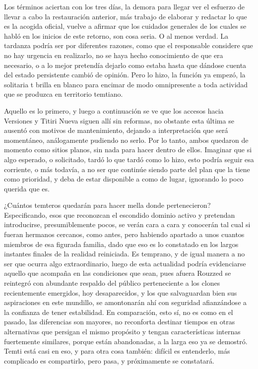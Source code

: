 \documentclass[
]{book}
\begin{document}
Los términos aciertan con los tres días, la demora para llegar ver el esfuerzo de llevar a cabo la restauración anterior, más trabajo de elaborar y redactar lo que es la acogida oficial, vuelve a afirmar que los cuidados generales de los cuales se habló en los inicios de este retorno, son cosa seria. O al menos verdad. La tardanza podría ser por diferentes razones, como que el responsable considere que no hay urgencia en realizarlo, no se haya hecho conocimiento de que era necesario, o a lo mejor pretendía dejarlo como estaba hasta que dándose cuenta del estado persistente cambió de opinión. Pero lo hizo, la función ya empezó, la solitaria t brilla en blanco para encimar de modo omnipresente a toda actividad que se produzca en territorio temtiano.

Aquello es lo primero, y luego a continuación se ve que los accesos hacia Versiones y Titiri Nueva siguen allí sin reformas, no obstante esta última se ausentó con motivos de mantenimiento, dejando a interpretación que será momentáneo, análogamente pudiendo no serlo. Por lo tanto, ambos quedaron de momento como sitios planos, sin nada para hacer dentro de ellos. Imaginar que si algo esperado, o solicitado, tardó lo que tardó como lo hizo, esto podría seguir esa corriente, o más todavía, a no ser que continúe siendo parte del plan que la tiene como prioridad, y deba de estar disponible a como de lugar, ignorando lo poco querida que es.

¿Cuántos temteros quedarán para hacer mella donde pertenecieron? Especificando, esos que reconozcan el escondido dominio activo y pretendan introducirse, presumiblemente pocos, se verán cara a cara y conocerán tal cual si fueran hermanos cercanos, como antes, pero habiendo apartado a unos cuantos miembros de esa figurada familia, dado que eso es lo constatado en los largos instantes finales de la realidad reiniciada. Es temprano, y de igual manera a no ser que ocurra algo extraordinario, luego de esta actualidad podría evidenciarse aquello que acompaña en las condiciones que sean, pues afuera Rouzzed se reintegró con abundante respaldo del público perteneciente a los clones recientemente emergidos, hoy desaparecidos, y los que salvaguardan bien sus aspiraciones en este mundillo, se amontonarán ahí con seguridad afianzándose a la confianza de tener estabilidad. En comparación, esto sí, no es como en el pasado, las diferencias son mayores, no reconforta destinar tiempos en otras alternativas que persigan el mismo propósito y tengan características internas fuertemente similares, porque están abandonadas, a la larga eso ya se demostró. Temti está casi en eso, y para otra cosa también: difícil es entenderlo, más complicado es compartirlo, pero pasa, y próximamente se constatará.
\end{document}
